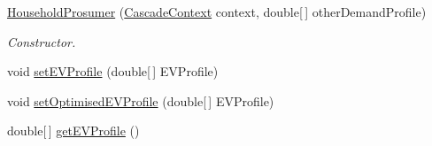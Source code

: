 \begin{DoxyCompactItemize}
\item 
\hyperlink{classuk_1_1ac_1_1dmu_1_1iesd_1_1cascade_1_1agents_1_1prosumers_1_1_household_prosumer_a68e62dcd9ce6e75fed51b70202bfce88}{Household\-Prosumer} (\hyperlink{classuk_1_1ac_1_1dmu_1_1iesd_1_1cascade_1_1context_1_1_cascade_context}{Cascade\-Context} context, double\mbox{[}$\,$\mbox{]} other\-Demand\-Profile)
\begin{DoxyCompactList}\small\item\em Constructor. \end{DoxyCompactList}\item 
void \hyperlink{classuk_1_1ac_1_1dmu_1_1iesd_1_1cascade_1_1agents_1_1prosumers_1_1_household_prosumer_a7fc42fb4ecb46243fc32147614e2ac8e}{set\-E\-V\-Profile} (double\mbox{[}$\,$\mbox{]} E\-V\-Profile)
\item 
void \hyperlink{classuk_1_1ac_1_1dmu_1_1iesd_1_1cascade_1_1agents_1_1prosumers_1_1_household_prosumer_a7959784ee5d3fd62c45ef8d713548644}{set\-Optimised\-E\-V\-Profile} (double\mbox{[}$\,$\mbox{]} E\-V\-Profile)
\item 
double\mbox{[}$\,$\mbox{]} \hyperlink{classuk_1_1ac_1_1dmu_1_1iesd_1_1cascade_1_1agents_1_1prosumers_1_1_household_prosumer_a49c919df739b2f0c6cfa512b6e2d5db3}{get\-E\-V\-Profile} ()
\end{DoxyCompactItemize}

